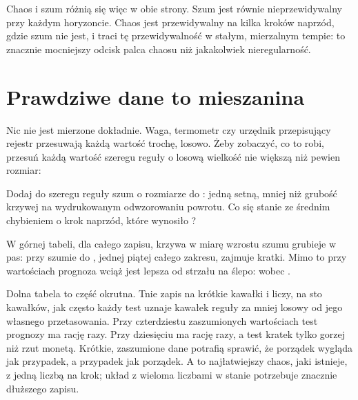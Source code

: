 Chaos i szum różnią się więc w obie strony. Szum jest równie nieprzewidywalny
przy każdym horyzoncie. Chaos jest przewidywalny na kilka kroków naprzód,
gdzie szum nie jest, i traci tę przewidywalność w stałym, mierzalnym tempie:
to znacznie mocniejszy odcisk palca chaosu niż jakakolwiek nieregularność.

\section{Prawdziwe dane to mieszanina}
\label{sec:ch15-noisy}

\noindent
Nic nie jest mierzone dokładnie. Waga, termometr czy urzędnik przepisujący
rejestr przesuwają każdą wartość trochę, losowo. Żeby zobaczyć, co to robi,
przesuń każdą wartość szeregu reguły o losową wielkość nie większą niż pewien
rozmiar:


\begin{think}
Dodaj do szeregu reguły szum o rozmiarze do : jedną
setną, mniej niż grubość krzywej na wydrukowanym odwzorowaniu powrotu. Co się
stanie ze średnim chybieniem o krok naprzód, które wynosiło ?
\end{think}



\noindent
W górnej tabeli, dla całego zapisu, krzywa w miarę wzrostu szumu grubieje w
pas: przy szumie do , jednej piątej całego zakresu,
zajmuje  kratki. Mimo to przy  wartościach
prognoza wciąż jest lepsza od strzału na ślepo: 
wobec .

Dolna tabela to część okrutna. Tnie zapis na krótkie kawałki i liczy, na sto
kawałków, jak często każdy test uznaje kawałek reguły za mniej losowy od jego
własnego przetasowania. Przy czterdziestu zaszumionych wartościach test
prognozy ma rację  razy. Przy dziesięciu ma rację
 razy, a test kratek tylko  \dash{}
gorzej niż rzut monetą. Krótkie, zaszumione dane potrafią sprawić, że porządek
wygląda jak przypadek, a przypadek jak porządek.
A to najłatwiejszy chaos, jaki istnieje, z jedną liczbą na krok; układ z
wieloma liczbami w stanie potrzebuje znacznie dłuższego zapisu.

